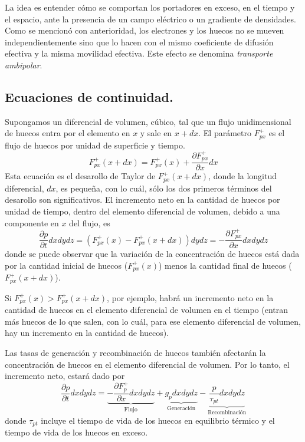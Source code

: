 \documentclass[12pt,a4paper]{article}
\begin{document}
La idea es entender cómo se comportan los portadores en exceso, en el tiempo y el espacio, ante la presencia de un campo eléctrico o un gradiente de densidades. Como se mencionó con anterioridad, los electrones y los huecos no se mueven independientemente sino que lo hacen con el mismo coeficiente de difusión efectiva y la misma movilidad efectiva. Este efecto se denomina \emph{transporte ambipolar}.

\subsection{Ecuaciones de continuidad.}

Supongamos un diferencial de volumen, cúbico, tal que un flujo unidimensional de huecos entra por el elemento en $x$ y sale en $x+dx$. El parámetro $F_{px}^{+}$ es el flujo de huecos por unidad de superficie y tiempo.
\[ F_{px}^{+}(x+dx)=F_{px}^{+}(x)+\frac{\partial F_{px}^{+}}{\partial x} dx \]
Esta ecuación es el desarollo de Taylor de $F_{px}^{+}(x+dx)$, donde la longitud diferencial, $dx$, es pequeña, con lo cuál, sólo los dos primeros términos del desarollo son significativos. El incremento neto en la cantidad de huecos por unidad de tiempo, dentro del elemento diferencial de volumen, debido a una componente en $x$ del flujo, es
\[ \frac{\partial p}{\partial t} dxdydz=(F_{px}^{+}(x)-F_{px}^{+}(x+dx))dydz=-\frac{\partial F_{px}^{+}}{\partial x} dx dy dz \]
donde se puede observar que la variación de la concentración de huecos está dada por la cantidad inicial de huecos ($F_{px}^{+}(x)$) menos la cantidad final de huecos ($F_{px}^{+}(x+dx)$).

Si $F_{px}^{+}(x)>F_{px}^{+}(x+dx)$, por ejemplo, habrá un incremento neto en la cantidad de huecos en el elemento diferencial de volumen en el tiempo (entran más huecos de lo que salen, con lo cuál, para ese elemento diferencial de volumen, hay un incremento en la cantidad de huecos).

Las tasas de generación y recombinación de huecos también afectarán la concentración de huecos en el elemento diferencial de volumen. Por lo tanto, el incremento neto, estará dado por
\[ \frac{\partial p}{\partial t} dxdydz = \underbrace{ - \frac{\partial F_{p}^{+}}{\partial x} dxdydz }_{\textrm{Flujo}}+\underbrace { g_{p}dxdydz }_{\textrm{Generación}}-\underbrace{ \frac{p}{\tau _{pt}}dxdydz }_{ \textrm{Recombinación}} \]
donde $\tau _{pt}$ incluye el tiempo de vida de los huecos en equilibrio térmico y el tiempo de vida de los huecos en exceso.
\end{document}
